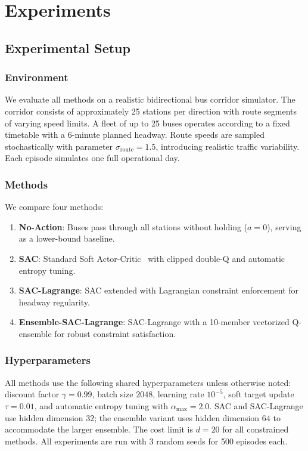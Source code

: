 \documentclass[10pt]{article}
\begin{document}
\section{Experiments}
\label{sec:experiments}

\subsection{Experimental Setup}

\subsubsection{Environment}

We evaluate all methods on a realistic bidirectional bus corridor simulator. The corridor consists of approximately 25 stations per direction with route segments of varying speed limits. A fleet of up to 25 buses operates according to a fixed timetable with a 6-minute planned headway. Route speeds are sampled stochastically with parameter $\sigma_{\text{route}} = 1.5$, introducing realistic traffic variability. Each episode simulates one full operational day.

\subsubsection{Methods}

We compare four methods:
\begin{enumerate}
    \item \textbf{No-Action}: Buses pass through all stations without holding ($a=0$), serving as a lower-bound baseline.
    \item \textbf{SAC}: Standard Soft Actor-Critic~\cite{Haarnoja2018SAC} with clipped double-Q and automatic entropy tuning.
    \item \textbf{SAC-Lagrange}: SAC extended with Lagrangian constraint enforcement for headway regularity.
    \item \textbf{Ensemble-SAC-Lagrange}: SAC-Lagrange with a 10-member vectorized Q-ensemble for robust constraint satisfaction.
\end{enumerate}

\subsubsection{Hyperparameters}

All methods use the following shared hyperparameters unless otherwise noted: discount factor $\gamma = 0.99$, batch size $2048$, learning rate $10^{-5}$, soft target update $\tau = 0.01$, and automatic entropy tuning with $\alpha_{\max} = 2.0$. SAC and SAC-Lagrange use hidden dimension $32$; the ensemble variant uses hidden dimension $64$ to accommodate the larger ensemble. The cost limit is $d = 20$ for all constrained methods. All experiments are run with 3 random seeds for 500 episodes each.
\end{document}
